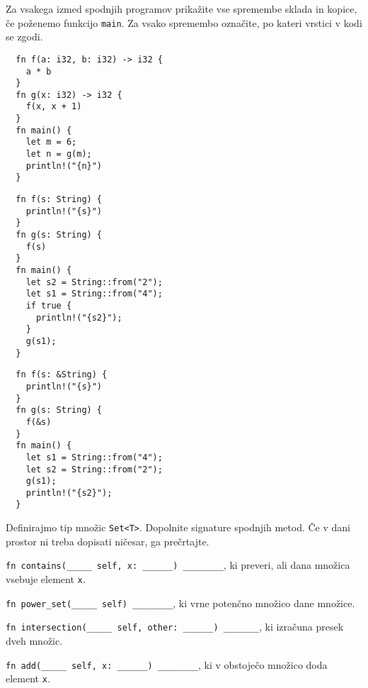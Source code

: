 \documentclass[arhiv]{../izpit}
\begin{document}


\naloga[\tocke{10}]

Za vsakega izmed spodnjih programov prikažite vse spremembe sklada in kopice, če poženemo funkcijo \texttt{main}. Za vsako spremembo označite, po kateri vrstici v kodi se zgodi.

\podnaloga
\begin{verbatim}
  fn f(a: i32, b: i32) -> i32 {
    a * b
  }
  fn g(x: i32) -> i32 {
    f(x, x + 1)
  }
  fn main() {
    let m = 6;
    let n = g(m);
    println!("{n}")
  }
\end{verbatim}

\podnaloga
\begin{verbatim}
  fn f(s: String) {
    println!("{s}")
  }
  fn g(s: String) {
    f(s)
  }
  fn main() {
    let s2 = String::from("2");
    let s1 = String::from("4");
    if true {
      println!("{s2}");
    }
    g(s1);
  }
\end{verbatim}

\podnaloga
\begin{verbatim}
  fn f(s: &String) {
    println!("{s}")
  }
  fn g(s: String) {
    f(&s)
  }
  fn main() {
    let s1 = String::from("4");
    let s2 = String::from("2");
    g(s1);
    println!("{s2}");
  }
\end{verbatim}



\naloga[\tocke{10}]

Definirajmo tip množic \texttt{Set<T>}. Dopolnite signature spodnjih metod. Če v dani prostor ni treba dopisati ničesar, ga prečrtajte.

\podnaloga
\texttt{fn contains(_____ self, x: ______) ________}, ki preveri, ali dana množica vsebuje element \texttt{x}.

\podnaloga
\texttt{fn power_set(_____ self) ________}, ki vrne potenčno množico dane množice.

\podnaloga
\texttt{fn intersection(_____ self, other: ______) _______}, ki izračuna presek dveh množic.

\podnaloga
\texttt{fn add(_____ self, x: ______) ________}, ki v obstoječo množico doda element \texttt{x}.
\end{document}
